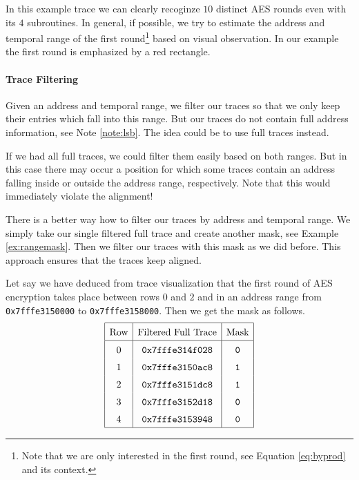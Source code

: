 		In this example trace we can clearly recoginze $10$ distinct AES rounds even with its $4$ subroutines. In general, if possible, we try to estimate the address and temporal range of the first round\footnote{Note that we are only interested in the first round, see Equation \ref{eq:byprod} and its context.} based on visual observation. In our example the first round is emphasized by a red rectangle.

	\paragraph{Trace Filtering}
		
		Given an address and temporal range, we filter our traces so that we only keep their entries which fall into this range. But our traces do not contain full address information, see Note \ref{note:lsb}. The idea could be to use full traces instead.
		
		If we had all full traces, we could filter them easily based on both ranges. But in this case there may occur a position for which some traces contain an address falling inside or outside the address range, respectively. Note that this would immediately violate the alignment!
		
		\begin{remark}
		\label{rem:rangemask}
			There is a better way how to filter our traces by address and temporal range. We simply take our single filtered full trace and create another mask, see Example \ref{ex:rangemask}. Then we filter our traces with this mask as we did before. This approach ensures that the traces keep aligned.
		\end{remark}
		
		\begin{example}
		\label{ex:rangemask}
			Let say we have deduced from trace visualization that the first round of AES encryption takes place between rows $0$ and $2$ and in an address range from {\tt 0x7fffe3150000} to {\tt 0x7fffe3158000}. Then we get the mask as follows.
			\[
			\arraycolsep=.5em\def\arraystretch{1.5}
				\begin{array}{|c|c|c|}
					\hline
					\textnormal{Row} & \textnormal{Filtered Full Trace} & \textnormal{Mask} \\
					\hline
					0 & {\tt 0x7fffe314f028} & {\tt 0} \\
					1 & {\tt 0x7fffe3150ac8} & {\tt 1} \\
					2 & {\tt 0x7fffe3151dc8} & {\tt 1} \\
					3 & {\tt 0x7fffe3152d18} & {\tt 0} \\
					4 & {\tt 0x7fffe3153948} & {\tt 0} \\
					\hline
				\end{array}
			\]
		\end{example}
		
